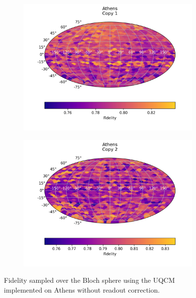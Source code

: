 \begin{figure}[H]
    \centering
    \begin{subfigure}{.5\textwidth}
      \centering
      \includegraphics[width=\textwidth]{Figures/UQCM/IBM/FullSphere/results_athens_copy1.png}
    \end{subfigure}%
    \begin{subfigure}{.5\textwidth}
      \centering
      \includegraphics[width=\textwidth]{Figures/UQCM/IBM/FullSphere/results_athens_copy2.png}
    \end{subfigure}
    \caption{Fidelity sampled over the Bloch sphere using the UQCM implemented on Athens without readout correction.}
\end{figure}


